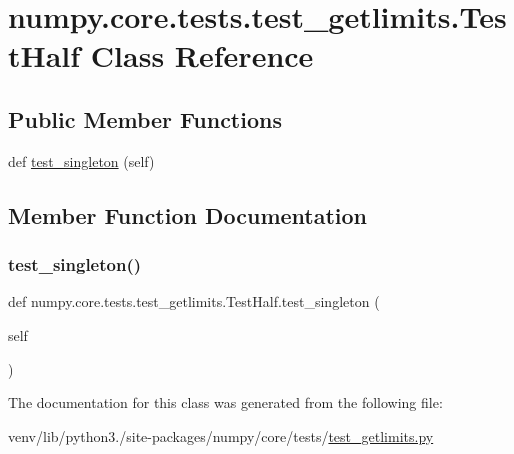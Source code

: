 \hypertarget{classnumpy_1_1core_1_1tests_1_1test__getlimits_1_1TestHalf}{}\section{numpy.\+core.\+tests.\+test\+\_\+getlimits.\+Test\+Half Class Reference}
\label{classnumpy_1_1core_1_1tests_1_1test__getlimits_1_1TestHalf}
\subsection*{Public Member Functions}
\begin{DoxyCompactItemize}
\item 
def \hyperlink{classnumpy_1_1core_1_1tests_1_1test__getlimits_1_1TestHalf_a9b22081beee70be15e66c83bcef45215}{test\+\_\+singleton} (self)
\end{DoxyCompactItemize}


\subsection{Member Function Documentation}
\mbox{\label{classnumpy_1_1core_1_1tests_1_1test__getlimits_1_1TestHalf_a9b22081beee70be15e66c83bcef45215}} 
\subsubsection{\texorpdfstring{test\+\_\+singleton()}{test\_singleton()}}
{\footnotesize\ttfamily def numpy.\+core.\+tests.\+test\+\_\+getlimits.\+Test\+Half.\+test\+\_\+singleton (\begin{DoxyParamCaption}\item[{}]{self }\end{DoxyParamCaption})}



The documentation for this class was generated from the following file\+:\begin{DoxyCompactItemize}
\item 
venv/lib/python3./site-\/packages/numpy/core/tests/\hyperlink{test__getlimits_8py}{test\+\_\+getlimits.\+py}\end{DoxyCompactItemize}

